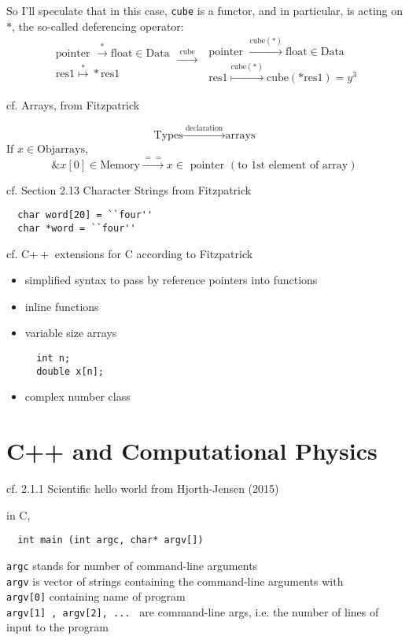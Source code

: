 \documentclass[10pt]{amsart}
\begin{document}
\begin{multicols*}{2}
So I'll speculate that in this case, \verb|cube| is a functor, and in particular, is acting on $*$, the so-called deferencing operator:
\[
\begin{gathered}
  \text{ pointer } \xrightarrow{ * } \text{float} \in \text{Data} \\
  \text{ res}1 \overset{*}{\mapsto} *\text{res}1
\end{gathered} \xrightarrow{ \text{ cube } } \begin{gathered}
  \text{ pointer } \xrightarrow{ \text{cube}(*) } \text{float} \in \text{Data} \\
  \text{ res}1 \overset{\text{cube}(*)}{\mapsto} \text{cube}(*\text{res}1)=y^3
\end{gathered}
\]

cf.  Arrays, from Fitzpatrick \cite{Fitz}

\[
\text{Types} \xrightarrow{ \text{ declaration } } \text{arrays}
\]
If $x\in \text{Obj}\text{arrays}$,
\[
\& x[0] \in \text{Memory} \xrightarrow{ == } x \in \text{ pointer } (\text{to 1st element of array})
\]


cf. Section 2.13 Character Strings from Fitzpatrick \cite{Fitz}

\begin{lstlisting}
  char word[20] = ``four''
  char *word = ``four''
\end{lstlisting}

cf. C$++$ extensions for C according to Fitzpatrick \cite{Fitz}
\begin{itemize}
\item simplified syntax to pass by reference pointers into functions
\item inline functions
\item variable size arrays \begin{lstlisting}
  int n;
  double x[n];
  \end{lstlisting}
\item complex number class
\end{itemize}


\part{C++ and Computational Physics}

cf. 2.1.1 Scientific hello world from Hjorth-Jensen (2015) \cite{Hjor2015}

in C, 
\begin{lstlisting}
  int main (int argc, char* argv[])
\end{lstlisting}
\verb|argc| stands for number of command-line arguments \\
\verb|argv| is vector of strings containing the command-line arguments with \\
\phantom{argv} \verb|argv[0]| containing name of program \\
\phantom{argv} \verb|argv[1] , argv[2], ... | are command-line args, i.e. the number of lines of input to the program


\end{multicols*}
\end{document}
